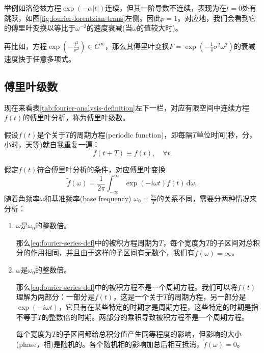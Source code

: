 举例如洛伦兹方程$\exp \left( - \alpha \left| t \right| \right)$连续，但其一阶导数不连续，表现为在$t=0$处有跳跃，如图\ref{fig:fourier-lorentzian-trans}左侧。因此$p=1$。对应地，我们会看到它的傅里叶变换以等比于$\omega^{-2}$的速度衰减(当$\omega$的值较大时)。

再比如，方程$\exp \left( - \frac{t^{2}}{\sigma^{2}} \right) \in C^{\infty}$，那么其傅里叶变换$\widetilde{F} = \exp \left( - \frac{1}{4} \sigma^{2} \omega^{2} \right)$的衰减速度快于任意多项式。

\subsection{傅里叶级数}
\label{sec:fourier-seires}
现在来看表\ref{tab:fourier-analysis-definition}左下一栏，对应有限空间中连续方程$f(t)$的傅里叶分析，称为傅里叶级数。

假设$f(t)$是个关于$T$的周期方程(periodic function)，即每隔$T$单位时间(秒，分，小时，天等)就自我重复一遍：
\begin{equation*}
  f(t+T) \equiv f(t), \quad \forall t.
\end{equation*}

假定$f(t)$符合傅里叶分析的条件，对应傅里叶变换
\begin{equation}
  \label{eq:fourier-series-def}
  \tilde{f}(\omega) = \frac{1}{2 \pi} \int_{-\infty}^{\infty}
  \exp \left( - i \omega t \right) f(t) \, \mathrm{d} \omega,
\end{equation}
随着角频率$\omega$和基准频率(base frequency) $
\omega_{0}=\frac{2 \pi}{T}$的关系不同，需要分两种情况来分析：
\begin{enumerate}
  \item $\omega$是$\omega_{0}$的整数倍。

  那么\eqref{eq:fourier-series-def}中的被积方程周期为$T$，每个宽度为$T$的子区间对总积分的作用相同，并且由于这样的子区间有无数个，我们有$\tilde{f} \left( \omega \right) = \infty$。
  \item $\omega$是$\omega_{0}$的整数倍。

  那么\eqref{eq:fourier-series-def}中的被积方程不是一个周期方程。我们可以将$f(t)$理解为两部分：一部分是$f(t)$，这是一个关于$T$的周期方程，另一部分是$\exp \left( - i \omega t \right)$，它只有在某些特定的时期才是周期方程，这些特定的时期是指不等于$T$的整数倍的时期。两部分的乘积导致被积方程不是一个周期方程。

  每个宽度为$T$的子区间都给总积分值产生同等程度的影响，但影响的大小(phase，相)是随机的。各个随机相的影响加总后相互抵消，$\tilde{f}(\omega) =0$。
\end{enumerate}

